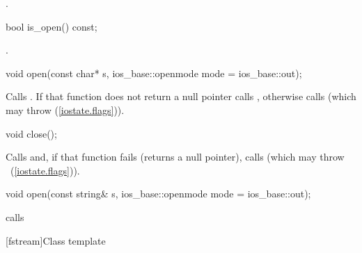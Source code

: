 \begin{itemdescr}
\pnum
\returns
{}.
\end{itemdescr}

%
\begin{itemdecl}
bool is_open() const;
\end{itemdecl}

\begin{itemdescr}
\pnum
\returns
{}.
\end{itemdescr}

%
\begin{itemdecl}
void open(const char* s, ios_base::openmode mode = ios_base::out);
\end{itemdecl}

\begin{itemdescr}
\pnum
\effects
Calls
.
If that function does not return a null pointer
calls ,
otherwise calls
(which may throw
 (\ref{iostate.flags})).
\end{itemdescr}

%
\begin{itemdecl}
void close();
\end{itemdecl}

\begin{itemdescr}
\pnum
\effects
Calls
and, if that function fails (returns a null pointer), calls
(which may throw
~(\ref{iostate.flags})).
\end{itemdescr}

%
\begin{itemdecl}
void open(const string& s, ios_base::openmode mode = ios_base::out);
\end{itemdecl}

\begin{itemdescr}
\pnum
\effects calls 
\end{itemdescr}

[fstream]{Class template }

